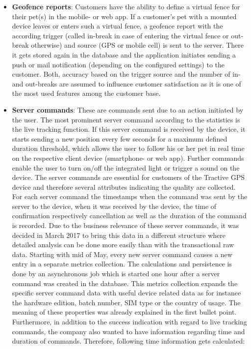 \begin{itemize}
	\item \textbf{Geofence reports}: Customers have the ability to define a virtual fence for their pet(s) in the mobile- or web app. If a customer's pet with a mounted device leaves or enters such a virtual fence, a geofence report with the according trigger (called in-break in case of entering the virtual fence or out-break otherwise) and source (GPS or mobile cell) is sent to the server. There it gets stored again in the database and the application initiates sending a push or mail notification (depending on the configured settings) to the customer. Both, accuracy based on the trigger source and the number of in- and out-breaks are assumed to influence customer satisfaction as it is one of the most used features among the customer base.  
	\item \textbf{Server commands}: These are commands sent due to an action initiated by the user. The most prominent server command according to the statistics is the live tracking function. If this server command is received by the device, it starts sending a new position every few seconds for a maximum defined duration threshold, which allows the user to follow his or her pet in real time on the respective client device (smartphone- or web app). Further commands enable the user to turn on/off the integrated light or trigger a sound on the device. The server commands are essential for customers of the Tractive GPS device and therefore several attributes indicating the quality are collected. For each server command the timestamps when the command was sent by the server to the device, when it was received by the device, the time of confirmation respectively cancellation as well as the duration of the command is recorded. 
	Due to the business relevance of these server commands, it was decided in March 2017 to bring this data in a different structure where detailed analysis can be done more easily than with the transactional raw data. Starting with mid of May, every new server command causes a new entry in a separate metrics collection. The calculations and persistence is done by an asynchronous job which is started one hour after a server command was created in the database. This metrics collection expands the specific server command data with useful device related data as for instance the hardware edition, batch number, SIM type or the country of usage. The meaning of these properties was already explained in the first bullet point. Furthermore, in addition to the success indication with regard to live tracking commands, the company also wanted to have information regarding time and duration of commands. Therefore, following time information gets calculated:
	

\end{itemize}
